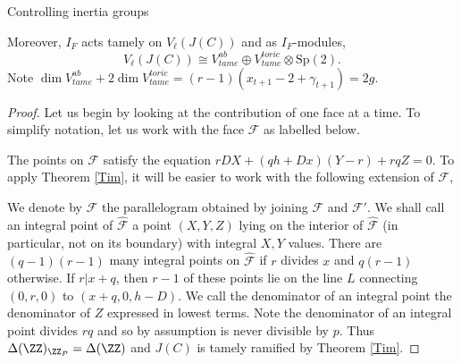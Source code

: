 \documentclass[11pt,a4paper]{article}
\newcommand{\F}{\mathcal{F}}
\begin{document}
\begin{section}{Controlling inertia groups}
\begin{theorem}
 Moreover, $I_F$ acts tamely on $V_\ell(J(C))$ and as $I_F$-modules,
 \[ V_\ell(J(C)) \cong V^{ab}_{tame}\oplus  V^{toric}_{tame} \otimes \mathrm{Sp}(2).
 \]
 Note $\dim V^{ab}_{tame}+ 2\dim V^{toric}_{tame} = (r-1)(x_{t+1}-2+\gamma_{t+1}) = 2g$.




\end{theorem}
\begin{proof}
Let us begin by looking at the contribution of one face at a time. To simplify notation, let us work with the face $\F$ as labelled below.
\begin{center}
\end{center}

The points on $\F$ satisfy the equation $rDX+(qh+Dx)(Y-r)+rqZ = 0 $. To apply Theorem \ref{Tim}, it will be easier to work with the following extension of $\F$,

\begin{center}
\end{center}
We denote by $\hat{\F}$ the parallelogram obtained by joining $\F$ and $\F'$.
We shall call an integral point of $\hat{\F}$ a point $(X,Y,Z)$ lying on the interior of $\hat{\F}$ (in particular, not on its boundary) with integral $X,Y$ values.
There are $(q-1)(r-1)$ many integral points on $\hat{\F}$  if $r$ divides $x$ and $q(r-1)$ otherwise.
If $r|x+q$, then $r-1$ of these points lie on the line $L$ connecting $(0,r,0)$ to $(x+q,0,h-D)$.
We call the denominator of an integral point the denominator of $Z$ expressed in lowest terms.
Note the denominator of an integral point divides $rq$ and so by assumption is never divisible by $p$.
Thus $\Delta(\ZZ)_{\ZZ_P} = \Delta(\ZZ)$ and $J(C)$ is tamely ramified by Theorem \ref{Tim}.


\end{proof}
\end{section}
\end{document}
